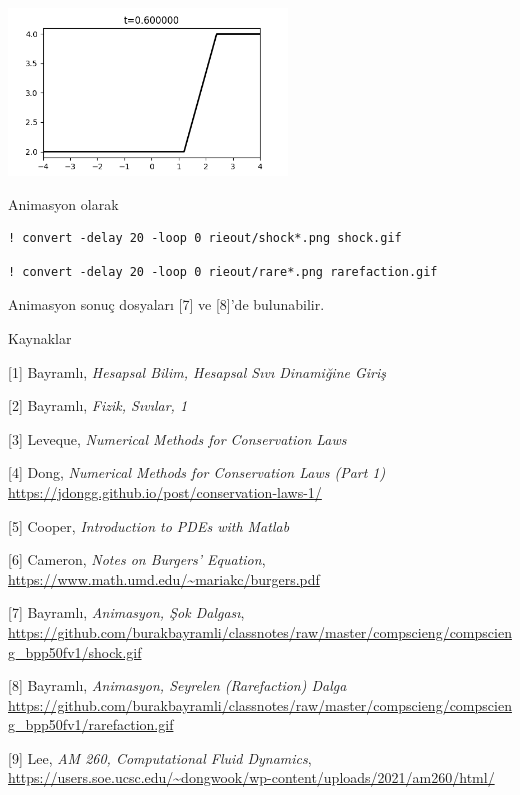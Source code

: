 \documentclass[12pt,fleqn]{article}\usepackage{../../common}
\begin{document}
\includegraphics[width=20em]{rieout/rarefaction-06.png}

Animasyon olarak

\begin{verbatim}
! convert -delay 20 -loop 0 rieout/shock*.png shock.gif
\end{verbatim}

\begin{verbatim}
! convert -delay 20 -loop 0 rieout/rare*.png rarefaction.gif
\end{verbatim}

Animasyon sonuç dosyaları [7] ve [8]'de bulunabilir.

Kaynaklar

[1] Bayramlı, {\em Hesapsal Bilim, Hesapsal Sıvı Dinamiğine Giriş}

[2] Bayramlı, {\em Fizik, Sıvılar, 1}

[3] Leveque, {\em Numerical Methods for Conservation Laws}

[4] Dong, {\em Numerical Methods for Conservation Laws (Part 1)}
    \url{https://jdongg.github.io/post/conservation-laws-1/}

[5] Cooper, {\em Introduction to PDEs with Matlab}

[6] Cameron, {\em Notes on Burgers' Equation},
    \url{https://www.math.umd.edu/~mariakc/burgers.pdf}

[7] Bayramlı, {\em Animasyon, Şok Dalgası},
    \url{https://github.com/burakbayramli/classnotes/raw/master/compscieng/compscieng_bpp50fv1/shock.gif}

[8] Bayramlı, {\em Animasyon, Seyrelen (Rarefaction) Dalga}
    \url{https://github.com/burakbayramli/classnotes/raw/master/compscieng/compscieng_bpp50fv1/rarefaction.gif}

[9] Lee, {\em AM 260, Computational Fluid Dynamics},
    \url{https://users.soe.ucsc.edu/~dongwook/wp-content/uploads/2021/am260/html/}
\end{document}
